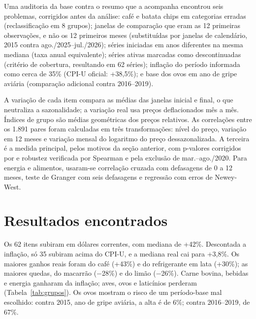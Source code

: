 \documentclass[
  article,            %
  12pt,
  oneside,
  a4paper,
  section=TITLE,      %
  english,            %
  brazil              %
]{abntex2}
\begin{document}
Uma auditoria da base contra o resumo que a acompanha encontrou seis problemas, corrigidos antes da análise: café e batata chips em categorias erradas (reclassificação em 8 grupos); janelas de comparação que eram as 12 primeiras observações, e não os 12 primeiros meses (substituídas por janelas de calendário, 2015 contra ago./2025--jul./2026); séries iniciadas em anos diferentes na mesma mediana (taxa anual equivalente); séries ativas marcadas como descontinuadas (critério de cobertura, resultando em 62 séries); inflação do período informada como cerca de 35\% (CPI-U oficial: +38,5\%); e base dos ovos em ano de gripe aviária (comparação adicional contra 2016--2019).

A variação de cada item compara as médias das janelas inicial e final, o que neutraliza a sazonalidade; a variação real usa preços deflacionados mês a mês. Índices de grupo são médias geométricas dos preços relativos. As correlações entre os 1.891 pares foram calculadas em três transformações: nível do preço, variação em 12 meses e variação mensal do logaritmo do preço dessazonalizada. A terceira é a medida principal, pelos motivos da seção anterior, com p-valores corrigidos por  e robustez verificada por Spearman e pela exclusão de mar.--ago./2020. Para energia e alimentos, usaram-se correlação cruzada com defasagens de 0 a 12 meses, teste de Granger com seis defasagens e regressão com erros de Newey-West.

\section{Resultados encontrados}

Os 62 itens subiram em dólares correntes, com mediana de +42\%. Descontada a inflação, só 35 subiram acima do CPI-U, e a mediana real cai para +3,8\%. Os maiores ganhos reais foram do café (+43\%) e do refrigerante em lata (+30\%); as maiores quedas, do macarrão ($-$28\%) e do limão ($-$26\%). Carne bovina, bebidas e energia ganharam da inflação; aves, ovos e laticínios perderam (Tabela~\ref{tab:grupos}). Os ovos mostram o risco de um período-base mal escolhido: contra 2015, ano de gripe aviária, a alta é de 6\%; contra 2016--2019, de 67\%.
\end{document}
